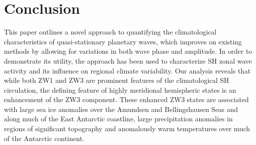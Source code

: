 \section{Conclusion}

This paper outlines a novel approach to quantifying the climatological characteristics of quasi-stationary planetary waves, which improves on existing methods by allowing for variations in both wave phase and amplitude. In order to demonstrate its utility, the approach has been used to characterize SH zonal wave activity and its influence on regional climate variability. Our analysis reveals that while both ZW1 and ZW3 are prominent features of the climatological SH circulation, the defining feature of highly meridional hemispheric states is an enhancement of the ZW3 component. These enhanced ZW3 states are associated with large sea ice anomalies over the Amundsen and Bellingshausen Seas and along much of the East Antarctic coastline, large precipitation anomalies in regions of significant topography and anomalously warm temperatures over much of the Antarctic continent. 

    
    